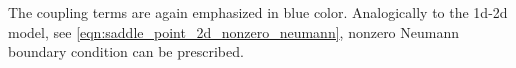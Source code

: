 \noindent
The coupling terms are again emphasized in blue color.
Analogically to the 1d-2d model, see \eqref{eqn:saddle_point_2d_nonzero_neumann}, nonzero
Neumann boundary condition can be prescribed.



% 
% 
% 
% 
% 
